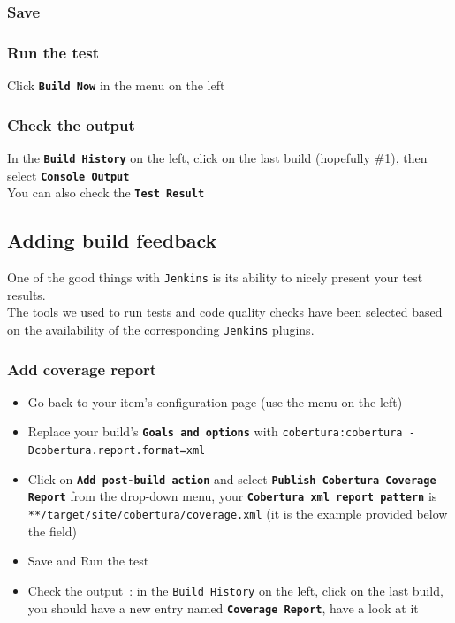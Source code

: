 \documentclass{article}
\begin{document}
\subsubsection{Save}

\subsubsection{Run the test}
Click \textbf{\texttt{Build Now}} in the menu on the left

\subsubsection{Check the output}
In the \textbf{\texttt{Build History}} on the left, click on the last build (hopefully \#1), then select \textbf{\texttt{Console Output}} \\
You can also check the \textbf{\texttt{Test Result}}

\subsection{Adding build feedback}
One of the good things with \texttt{Jenkins} is its ability to nicely present your test results. \\
The tools we used to run tests and code quality checks have been selected based on the availability of the corresponding \texttt{Jenkins} plugins.

\subsubsection{Add coverage report}
\begin{itemize}
\item Go back to your item's configuration page (use the menu on the left)
\item Replace your build's \textbf{\texttt{Goals and options}} with \texttt{cobertura:cobertura -Dcobertura.report.format=xml}
\item Click on \textbf{\texttt{Add post-build action}} and select \textbf{\texttt{Publish Cobertura Coverage Report}} from the drop-down menu, your \textbf{\texttt{Cobertura xml report pattern}} is \texttt{**/target/site/cobertura/coverage.xml} (it is the example provided below the field)
\item Save and Run the test
\item Check the output~: in the \texttt{Build History} on the left, click on the last build, you should have a new entry named \textbf{\texttt{Coverage Report}}, have a look at it
\end{itemize}
\end{document}
